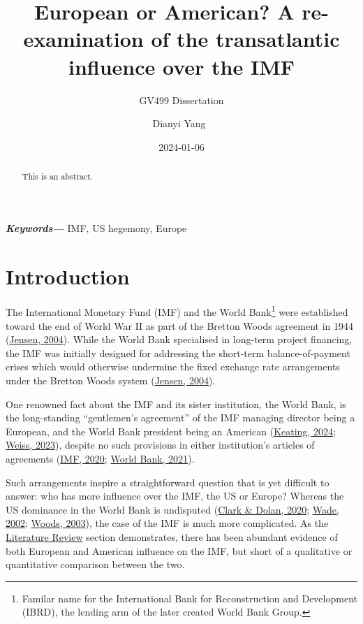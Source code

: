 \documentclass[
  letterpaper,
  abstract=true]{scrartcl}
\title{European or American? A re-examination of the transatlantic
influence over the IMF}
\subtitle{GV499 Dissertation}
\author{Dianyi Yang~\orcidlink{0009-0004-4652-3429}\textsuperscript{}}
\date{2024-01-06}
\providecommand{\keywords}[1]
{
  \small	
  \textbf
{\textit{Keywords---}} #1
}
\begin{document}
\maketitle
\begin{abstract}
This is an abstract.
\end{abstract}
\begin{center}
\keywords{IMF, US hegemony, Europe}
\end{center}
\ifdefined\Shaded\renewenvironment{Shaded}{\begin{tcolorbox}[enhanced, interior hidden, breakable, boxrule=0pt, borderline west={3pt}{0pt}{shadecolor}, frame hidden, sharp corners]}{\end{tcolorbox}}\fi

\newpage

\hypertarget{introduction}{%
\section{Introduction}\label{introduction}}

The International Monetary Fund (IMF) and the World Bank\footnote{Familar
  name for the International Bank for Reconstruction and Development
  (IBRD), the lending arm of the later created World Bank Group.} were
established toward the end of World War II as part of the Bretton Woods
agreement in 1944 (\protect\hyperlink{ref-jensen2004}{Jensen, 2004}).
While the World Bank specialised in long-term project financing, the IMF
was initially designed for addressing the short-term balance-of-payment
crises which would otherwise undermine the fixed exchange rate
arrangements under the Bretton Woods system
(\protect\hyperlink{ref-jensen2004}{Jensen, 2004}).

One renowned fact about the IMF and its sister institution, the World
Bank, is the long-standing ``gentlemen's agreement'' of the IMF managing
director being a European, and the World Bank president being an
American (\protect\hyperlink{ref-Keating2024}{Keating, 2024};
\protect\hyperlink{ref-Weiss2023}{Weiss, 2023}), despite no such
provisions in either institution's articles of agreements
(\protect\hyperlink{ref-Fund2020}{IMF, 2020};
\protect\hyperlink{ref-WorldBank2021}{World Bank, 2021}).

Such arrangements inspire a straightforward question that is yet
difficult to answer: who has more influence over the IMF, the US or
Europe? Whereas the US dominance in the World Bank is undisputed
(\protect\hyperlink{ref-clark2020}{Clark \& Dolan, 2020};
\protect\hyperlink{ref-wade2002}{Wade, 2002};
\protect\hyperlink{ref-woods2003}{Woods, 2003}), the case of the IMF is
much more complicated. As the
\protect\hyperlink{sec-litreview}{Literature Review} section
demonstrates, there has been abundant evidence of both European and
American influence on the IMF, but short of a qualitative or
quantitative comparison between the two.
\end{document}

